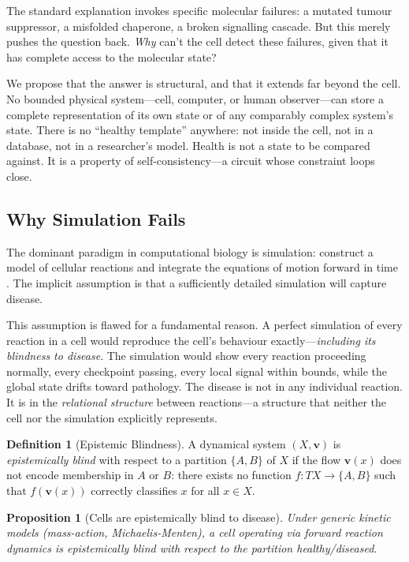 \documentclass[10pt,twocolumn,a4paper]{article}
\theoremstyle{plain}
\newtheorem{proposition}[theorem]{Proposition}
\theoremstyle{definition}
\newtheorem{definition}[theorem]{Definition}
\theoremstyle{remark}
\begin{document}
The standard explanation invokes specific molecular failures: a mutated tumour suppressor, a misfolded chaperone, a broken signalling cascade. But this merely pushes the question back. \emph{Why} can't the cell detect these failures, given that it has complete access to the molecular state?

We propose that the answer is structural, and that it extends far beyond the cell. No bounded physical system---cell, computer, or human observer---can store a complete representation of its own state or of any comparably complex system's state. There is no ``healthy template'' anywhere: not inside the cell, not in a database, not in a researcher's model. Health is not a state to be compared against. It is a property of self-consistency---a circuit whose constraint loops close.

\subsection{Why Simulation Fails}

The dominant paradigm in computational biology is simulation: construct a model of cellular reactions and integrate the equations of motion forward in time \citep{karr2012,kitano2002}. The implicit assumption is that a sufficiently detailed simulation will capture disease.

This assumption is flawed for a fundamental reason. A perfect simulation of every reaction in a cell would reproduce the cell's behaviour exactly---\emph{including its blindness to disease}. The simulation would show every reaction proceeding normally, every checkpoint passing, every local signal within bounds, while the global state drifts toward pathology. The disease is not in any individual reaction. It is in the \emph{relational structure} between reactions---a structure that neither the cell nor the simulation explicitly represents.

\begin{definition}[Epistemic Blindness]
\label{def:blind}
A dynamical system $(X, \mathbf{v})$ is \emph{epistemically blind} with respect to a partition $\{A, B\}$ of $X$ if the flow $\mathbf{v}(x)$ does not encode membership in $A$ or $B$: there exists no function $f: TX \to \{A, B\}$ such that $f(\mathbf{v}(x))$ correctly classifies $x$ for all $x \in X$.
\end{definition}

\begin{proposition}[Cells are epistemically blind to disease]
\label{prop:blind}
Under generic kinetic models (mass-action, Michaelis-Menten), a cell operating via forward reaction dynamics is epistemically blind with respect to the partition \emph{healthy}/\emph{diseased}.
\end{proposition}
\end{document}
